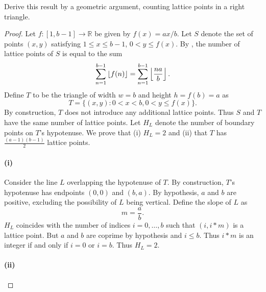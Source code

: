 \documentclass{report}
\begin{document}
Derive this result by a geometric argument, counting lattice points in a right
  triangle.

\begin{proof}

  Let $f \colon [1, b - 1] \rightarrow \mathbb{R}$ be given by $f(x) = ax / b$.
  Let $S$ denote the set of points $(x, y)$ satisfying $1 \leq x \leq b - 1$,
    $0 < y \leq f(x)$.
  By , the number of lattice points of $S$ is equal
    to the sum
    \begin{equation}
      \label{sub:exercise-1.11.7a-eq1}
      \sum_{n=1}^{b-1} \left\lfloor f(n)\right\rfloor = \sum_{n=1}^{b-1} \left\lfloor\frac{na}{b}\right\rfloor.
    \end{equation}
  Define $T$ to be the triangle of width $w = b$ and height $h = f(b) = a$
    as $$T = \{ (x, y) : 0 < x < b, 0 < y \leq f(x) \}.$$
  By construction, $T$ does not introduce any additional lattice points.
  Thus $S$ and $T$ have the same number of lattice points.
  Let $H_L$ denote the number of boundary points on $T$'s hypotenuse.
  We prove that (i) $H_L = 2$ and (ii) that $T$ has $\frac{(a - 1)(b - 1)}{2}$
    lattice points.

  \paragraph{(i)}%
  \label{par:exercise-1.11.7a-i}

    Consider the line $L$ overlapping the hypotenuse of $T$.
    By construction, $T$'s hypotenuse has endpoints $(0, 0)$ and $(b, a)$.
    By hypothesis, $a$ and $b$ are positive, excluding the possibility of $L$
      being vertical.
    Define the slope of $L$ as $$m = \frac{a}{b}.$$
    $H_L$ coincides with the number of indices $i = 0, \ldots, b$ such that
      $(i, i * m)$ is a lattice point.
    But $a$ and $b$ are coprime by hypothesis and $i \leq b$.
    Thus $i * m$ is an integer if and only if $i = 0$ or $i = b$.
    Thus $H_L = 2$.

  \paragraph{(ii)}%


\end{proof}
\end{document}
